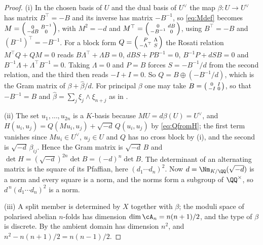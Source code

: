 \begin{proof}
(i) In the chosen basis of $U$ and the dual basis of $U^{\vee}$ the map
$\beta\colon U\to U^{\vee}$ has matrix $B^{\top}=-B$ and its inverse has
matrix $-B^{-1}$, so \eqref{eq:Mdef} becomes
$M=\begin{psmallmatrix}0&B^{-1}\\-dB&0\end{psmallmatrix}$, with
$M^{2}=-d$ and
$M^{\top}=\begin{psmallmatrix}0&dB\\-B^{-1}&0\end{psmallmatrix}$, using
$B^{\top}=-B$ and $(B^{-1})^{\top}=-B^{-1}$. For a block form
$Q=\begin{psmallmatrix}P&\Lambda\\-\Lambda^{\top}&S\end{psmallmatrix}$ the
Rosati relation $M^{\top}Q+QM=0$ reads
$B\Lambda^{\top}+\Lambda B=0$, $dBS+PB^{-1}=0$, $B^{-1}P+dSB=0$ and
$B^{-1}\Lambda+\Lambda^{\top}B^{-1}=0$. Taking $\Lambda=0$ and $P=B$ forces
$S=-B^{-1}/d$ from the second relation, and the third then reads $-I+I=0$.
So $Q=B\oplus(-B^{-1}/d)$, which is the Gram matrix of
$\beta+\widehat\beta/d$. For principal $\beta$ one may take
$B=\begin{psmallmatrix}0&I\\-I&0\end{psmallmatrix}$, so that $-B^{-1}=B$
and $\widehat\beta=\sum_{j}\xi_{j}\wedge\xi_{n+j}$ as in
.

(ii) The set $u_{1},\dots,u_{2n}$ is a $K$-basis because
$MU=d\beta(U)=U^{\vee}$, and $H(u_{i},u_{j})=Q(Mu_{i},u_{j})+\sqrt{-d}\,Q(u_{i},u_{j})$
by \eqref{eq:QfromH}; the first term vanishes since $Mu_{i}\in U^{\vee}$,
$u_{j}\in U$ and $Q$ has no cross block by (i), and the second is
$\sqrt{-d}\,\beta_{ij}$. Hence the Gram matrix is $\sqrt{-d}\,B$ and
$\det H=(\sqrt{-d})^{2n}\det B=(-d)^{n}\det B$. The determinant of an
alternating matrix is the square of its Pfaffian, here $(d_{1}\cdots
d_{n})^{2}$. Now $d=\Nm_{K/\QQ}(\sqrt{-d})$ is a norm and every square is a
norm, and the norms form a subgroup of $\QQ^{\times}$, so
$d^{\,n}(d_{1}\cdots d_{n})^{2}$ is a norm.

(iii) A split member is determined by $X$ together with $\beta$; the moduli
space of polarised abelian $n$-folds has dimension $\dim\cA_{n}=n(n+1)/2$,
and the type of $\beta$ is discrete. By  the ambient domain has
dimension $n^{2}$, and $n^{2}-n(n+1)/2=n(n-1)/2$.


\end{proof}
